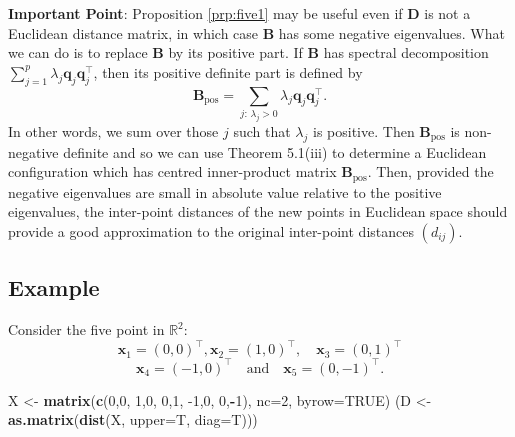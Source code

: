 \documentclass[]{book}
\newenvironment{Shaded}{\begin{snugshade}}{\end{snugshade}}
\newcommand{\DataTypeTok}[1]{\textcolor[rgb]{0.13,0.29,0.53}{#1}}
\newcommand{\DecValTok}[1]{\textcolor[rgb]{0.00,0.00,0.81}{#1}}
\newcommand{\KeywordTok}[1]{\textcolor[rgb]{0.13,0.29,0.53}{\textbf{#1}}}
\newcommand{\NormalTok}[1]{#1}
\newcommand{\OperatorTok}[1]{\textcolor[rgb]{0.81,0.36,0.00}{\textbf{#1}}}
\newcommand{\OtherTok}[1]{\textcolor[rgb]{0.56,0.35,0.01}{#1}}
\newcommand{\StringTok}[1]{\textcolor[rgb]{0.31,0.60,0.02}{#1}}
\theoremstyle{definition}
\theoremstyle{definition}
\theoremstyle{definition}
\theoremstyle{remark}
\begin{document}
\textbf{Important Point}: Proposition \ref{prp:five1} may be useful even if \({\mathbf D}\) is not a Euclidean distance matrix, in which case \(\boldsymbol B\) has some negative eigenvalues. What we can do is to replace \(\boldsymbol B\) by its positive part. If \(\boldsymbol B\) has spectral decomposition \(\sum_{j=1}^p \lambda_j \boldsymbol q_j \boldsymbol q_j^\top\), then its positive definite part is defined by
\[
\boldsymbol B_{\text{pos}}=\sum_{j: \, \lambda_j>0} \lambda_j \boldsymbol q_j \boldsymbol q_j^\top.
\]
In other words, we sum over those \(j\) such that \(\lambda_j\) is positive.
Then \(\boldsymbol B_{\text{pos}}\) is non-negative definite and so we can use Theorem 5.1(iii) to determine a Euclidean configuration which has centred inner-product matrix \(\boldsymbol B_{\text{pos}}\). Then, provided the negative eigenvalues are small in absolute value relative to the positive eigenvalues, the inter-point distances of the new points in Euclidean space should provide a good approximation to the original inter-point distances \((d_{ij})\).

\hypertarget{example-2}{%
\subsection{Example}\label{example-2}}

Consider the five point in \(\mathbb{R}^2\):
\[
\boldsymbol x_1=(0,0)^\top,  \boldsymbol x_2 =(1,0)^\top, \quad \boldsymbol x_3 =(0,1)^\top
\]
\[
\boldsymbol x_4 =(-1,0)^\top \quad \text{and} \quad \boldsymbol x_5=(0,-1)^\top.
\]

\begin{Shaded}
\begin{Highlighting}[]
\NormalTok{X <-}\StringTok{ }\KeywordTok{matrix}\NormalTok{(}\KeywordTok{c}\NormalTok{(}\DecValTok{0}\NormalTok{,}\DecValTok{0}\NormalTok{,}
              \DecValTok{1}\NormalTok{,}\DecValTok{0}\NormalTok{,}
              \DecValTok{0}\NormalTok{,}\DecValTok{1}\NormalTok{,}
              \DecValTok{-1}\NormalTok{,}\DecValTok{0}\NormalTok{,}
              \DecValTok{0}\NormalTok{,}\OperatorTok{-}\DecValTok{1}\NormalTok{), }\DataTypeTok{nc=}\DecValTok{2}\NormalTok{, }\DataTypeTok{byrow=}\OtherTok{TRUE}\NormalTok{)}
\NormalTok{(D <-}\StringTok{ }\KeywordTok{as.matrix}\NormalTok{(}\KeywordTok{dist}\NormalTok{(X, }\DataTypeTok{upper=}\NormalTok{T, }\DataTypeTok{diag=}\NormalTok{T)))}
\end{Highlighting}
\end{Shaded}
\end{document}
